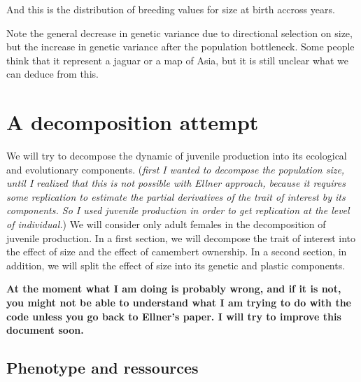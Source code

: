 \documentclass{article}\usepackage{knitr}
\begin{document}
And this is the distribution of breeding values for size at birth accross years.
\begin{knitrout}
\color{fgcolor}\begin{kframe}


{\ttfamily\noindent\bfseries\color{errorcolor}{\#\# Error: object 'popfile' not found}}\end{kframe}
\end{knitrout}

Note the general decrease in genetic variance due to directional selection on size, but the increase in genetic variance after the population bottleneck. Some people think that it represent a jaguar or a map of Asia, but it is still unclear what we can deduce from this.

\section{A decomposition attempt}
We will try to decompose the dynamic of juvenile production into its ecological and evolutionary components. (\textit{first I wanted to decompose the population size, until I realized that this is not possible with Ellner approach, because it requires some replication to estimate the partial derivatives of the trait of interest by its components. So I used juvenile production in order to get replication at the level of individual.})
We will consider only adult females in the decomposition of juvenile production.
In a first section, we will decompose the trait of interest into the effect of size and the effect of camembert ownership.
In a second section, in addition, we will split the effect of size into its genetic and plastic components.

\textbf{At the moment what I am doing is probably wrong, and if it is not, you might not be able to understand what I am trying to do with the code unless you go back to Ellner's paper. I will try to improve this document soon.}
\subsection{Phenotype and ressources}

\begin{knitrout}
\color{fgcolor}\begin{kframe}


{\ttfamily\noindent\bfseries\color{errorcolor}{\#\# Error: object 'popfile' not found}}\end{kframe}
\end{knitrout}
\end{document}
